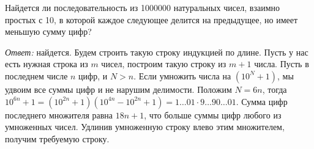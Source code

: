 \problem
Найдется ли последовательность из 1000000 натуральных чисел, взаимно простых с
10, в которой каждое следующее делится на предыдущее, но имеет меньшую сумму
цифр?

\solution
\emph{Ответ:} найдется.
Будем строить такую строку индукцией по длине.
Пусть у нас есть нужная строка из $m$ чисел, построим такую строку из $m + 1$
числа.
Пусть в последнем числе $n$ цифр, и $N > n$.
Если умножить числа на $(10^N + 1)$, мы удвоим все суммы цифр и не нарушим
делимости.
Положим $N = 6 n$, тогда
\(
    10^{6 n} + 1
=
    (10^{2n} + 1) (10^{4n} - 10^{2n} + 1)
=
    1\ldots01 \cdot 9\ldots90\ldots01
\).
Сумма цифр последнего множителя равна $18 n + 1$, что больше суммы цифр любого
из умноженных чисел.
Удлинив умноженную строку влево этим множителем, получим требуемую строку.
\endproblem
